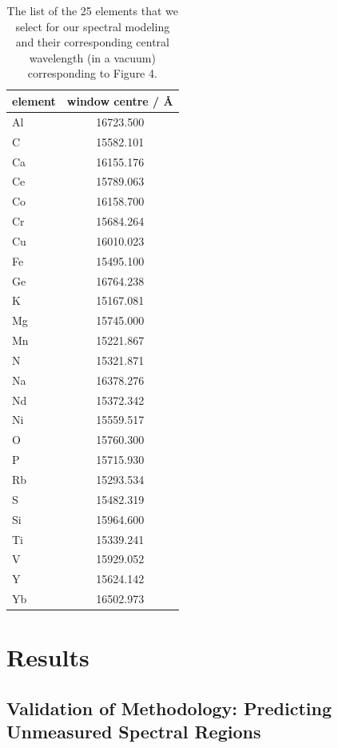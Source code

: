 \documentclass[a4paper,fleqn,usenatbib]{mnras}
\begin{document}
\begin{table}
    \centering
    \caption{The list of the 25 elements that we select for our spectral modeling and their corresponding central wavelength (in a vacuum) corresponding to Figure 4.}
    \label{tab:window_centres}
    \begin{tabular}{lc}
        \hline
        element & window centre / \AA \\
        \hline
        Al & 16723.500 \\
        C & 15582.101 \\
        Ca & 16155.176 \\
        Ce & 15789.063 \\
        Co & 16158.700 \\
        Cr & 15684.264 \\
        Cu & 16010.023 \\
        Fe & 15495.100 \\
        Ge & 16764.238 \\
        K & 15167.081 \\
        Mg & 15745.000 \\
        Mn & 15221.867 \\
        N & 15321.871 \\
        Na & 16378.276 \\
        Nd & 15372.342 \\
        Ni & 15559.517 \\
        O & 15760.300 \\
        P & 15715.930 \\
        Rb & 15293.534 \\
        S & 15482.319 \\
        Si & 15964.600 \\
        Ti & 15339.241 \\
        V & 15929.052 \\
        Y & 15624.142 \\
        Yb & 16502.973 \\
        \hline
    \end{tabular}
\end{table}


\section{Results}

\subsection{Validation of Methodology: Predicting Unmeasured Spectral Regions}
\end{document}
